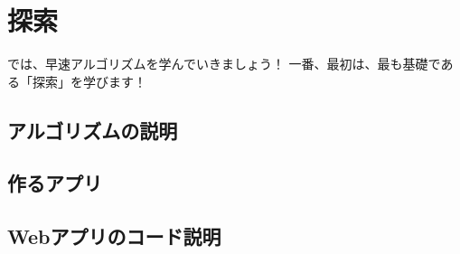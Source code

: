 \chapter{探索}
\label{chap:chap02-search}

では、早速アルゴリズムを学んでいきましょう！
一番、最初は、最も基礎である「探索」を学びます！

\section{アルゴリズムの説明}
\label{sec:2-1}

\section{作るアプリ}
\label{sec:2-2}

\section{Webアプリのコード説明}
\label{sec:2-3}
